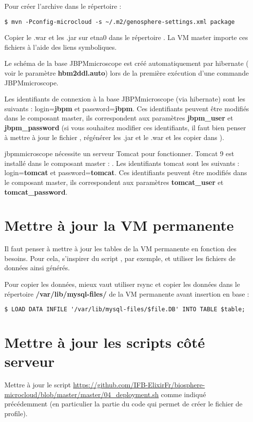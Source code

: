 Pour créer l'archive  dans le répertoire  :
\begin{lstlisting}[style=bash]
$ mvn -Pconfig-microcloud -s ~/.m2/genosphere-settings.xml package
\end{lstlisting}
\bigskip

Copier le .war et les .jar sur etna0 dans le répertoire .
La VM master importe ces fichiers à l’aide des liens symboliques.
\newline

Le schéma de la base JBPMmicroscope est créé automatiquement par hibernate ( voir le paramètre \textbf{hbm2ddl.auto}) lors de la première exécution d'une commande JBPMmicroscope.
\newline

Les identifiants de connexion à la base JBPMmicroscope (via hibernate) sont les suivants :
login=\textbf{jbpm} et password=\textbf{jbpm}. Ces identifiants peuvent être modifiés dans le composant master, ils correspondent aux paramètres \textbf{jbpm\_user} et \textbf{jbpm\_password} (si vous souhaitez modifier ces identifiants, il faut bien penser à mettre à jour le fichier , régénérer les .jar et le .war et les copier dans ).
\newline

jbpmmicroscope nécessite un serveur Tomcat pour fonctionner. Tomcat 9 est installé dans le composant master : . Les identifiants tomcat sont les suivants : login=\textbf{tomcat} et password=\textbf{tomcat}.
Ces identifiants peuvent être modifiés dans le composant master, ils correspondent aux paramètres \textbf{tomcat\_user} et \textbf{tomcat\_password}.

\section{Mettre à jour la VM permanente}

Il faut penser à mettre à jour les tables de la VM permanente en fonction des besoins. Pour cela, s'inspirer du script , par exemple, et utiliser les fichiers de données ainsi générés.
\bigskip

Pour copier les données, mieux vaut utiliser rsync et copier les données dans le répertoire \textbf{/var/lib/mysql-files/} de la VM permanente avant insertion en base :
\begin{lstlisting}[style=bash]
$ LOAD DATA INFILE '/var/lib/mysql-files/$file.DB' INTO TABLE $table;
\end{lstlisting}

\section{Mettre à jour les scripts côté serveur}

Mettre à jour le script \url{https://github.com/IFB-ElixirFr/biosphere-microcloud/blob/master/master/04_deployment.sh} comme indiqué précédemment (en particulier la partie du code qui permet de créer le fichier de profile).


